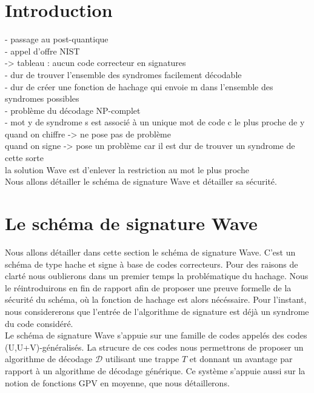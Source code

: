 \documentclass[12pt]{article}
\theoremstyle{definition}
\begin{document}
\section*{Introduction}

- passage au post-quantique \\
- appel d'offre NIST \\
	-> tableau : aucun code correcteur en signatures \\
- dur de trouver l'ensemble des syndromes facilement décodable \\
- dur de créer une fonction de hachage qui envoie m dans l'ensemble des syndromes possibles \\
- problème du décodage NP-complet \\
- mot y de syndrome s est associé à un unique mot de code c le plus proche de y \\
quand on chiffre -> ne pose pas de problème \\
quand on signe -> pose un problème car il est dur de trouver un syndrome de cette sorte \\
la solution Wave est d'enlever la restriction au mot le plus proche \\
Nous allons détailler le schéma de signature Wave et détailler sa sécurité. \\

\section{Le schéma de signature Wave}
Nous allons détailler dans cette section le schéma de signature Wave. C'est un schéma de type hache et signe à base de codes correcteurs. Pour des raisons de clarté nous oublierons dans un premier temps la problématique du hachage. Nous le réintroduirons en fin de rapport afin de proposer une preuve formelle de la sécurité du schéma, où la fonction de hachage est alors nécéssaire. Pour l'instant, nous considererons que l'entrée de l'algorithme de signature est déjà un syndrome du code considéré.\\
Le schéma de signature Wave s'appuie sur une famille de codes appelés des codes (U,U+V)-généralisés. La strucure de ces codes nous permettrons de proposer un algorithme de décodage $\mathcal{D}$ utilisant une trappe $T$ et donnant un avantage par rapport à un algorithme de décodage générique. Ce système s'appuie aussi sur la notion de fonctions GPV en moyenne, que nous détaillerons.
\end{document}
